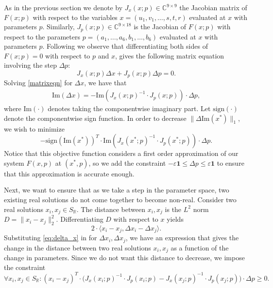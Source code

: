 \documentclass[12pt]{amsart}
\theoremstyle{definition}
\theoremstyle{definition}
\numberwithin{equation}{section}
\newcommand{\RR}{\mathbb{R}}
\begin{document}
As in the previous section we denote by $J_{x}(x;p)\in\mathbb{C}^{9\times 9}$ the Jacobian matrix of $F(x;p)$ with respect to the variables $x=(u_{1},v_{1}, \dots, s,t,r)$ evaluated at $x$ with parameters $p$.
Similarly, $J_{p}(x;p)\in\mathbb{C}^{9\times 18}$ is the Jacobian of $F(x;p)$ with respect to the parameters $p=(a_{1},\dots, a_{6},b_{1},\dots,b_{6})$ evaluated at $x$ with parameters $p$. 
Following \cite{LinearProgram} we observe that differentiating both sides of $F(x;p)=0$ with respect to $p$ and $x$, gives the following matrix equation involving the step $\Delta p$:
\begin{equation}
    J_{x}(x;p)\Delta x + J_{p}(x;p)\Delta p=0. \label{matrixeqn}
\end{equation}
Solving \eqref{matrixeqn} for $\Delta x$, we have that 
\begin{align} \text{Im}(\Delta x) = -\text{Im}(J_x(x;p)^{-1}\cdot J_p(x;p) ) \cdot \Delta p, \label{eq:delta_x}
\end{align}
where $ \text{Im}(\cdot)$ denotes taking the componentwise imaginary part. Let $ \text{sign}(\cdot)$ denote the componentwise sign function.
In order to decrease $\lVert \Delta \text{Im}(x^*) \rVert_1$, we wish to minimize
\[ -\text{sign}(\text{Im}(x^*))^T \cdot \text{Im}(J_x(x^*;p)^{-1}\cdot J_p(x^*;p) ) \cdot \Delta p.\]
Notice that this objective function considers a first order approximation of our system $F(x,p)$ at $(x^*,p)$, so we add the constraint $-\varepsilon\mathbf{1}\leq\Delta p\leq \varepsilon\mathbf{1}$ to ensure that this approximation is accurate enough.



Next, we want to ensure that as we take a step in the parameter space, two existing real solutions do not come together to become non-real. Consider two real solutions $x_i, x_j \in S_{\RR}$. The distance between $x_i, x_j$ is the $L^2$ norm $D = \lVert x_i - x_j \rVert_2^2$. Differentiating $D$ with respect to $x$ yields
\[ 2 \cdot \langle x_i - x_j, \Delta x_i - \Delta x_j \rangle .\]
Substituting \eqref{eq:delta_x} in for $\Delta x_i, \Delta x_j$, we have an expression that gives the change in the distance between two real solutions $x_i,x_j$ as a function of the change in parameters. Since we do not want this distance to decrease, we impose the constraint
\[\forall x_i, x_j \in S_{\RR}: (x_i - x_j)^T \cdot \big( J_x(x_i;p)^{-1} \cdot J_p(x_i;p) - J_x(x_j;p)^{-1} \cdot J_p(x_j;p) \big) \cdot \Delta p \geq 0.\]
\end{document}

